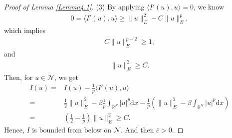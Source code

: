 \documentclass[12pt,a4paper,reqno]{amsart}
\numberwithin{equation}{section}
\begin{document}
\begin{proof}[Proof of Lemma \ref{Lemma4.1}]
(3)
By applying $\langle I'(u),u\rangle=0$, we know
\begin{equation*}
\begin{aligned}
0
=\langle I'(u),u\rangle\geqslant \|u\|_{E}^{2}
-C\|u\|_{E}^{p},
\end{aligned}
\end{equation*}
which implies
\begin{equation*}
\begin{aligned}
C\|u\|_{E}^{p-2}
\geqslant
1,
\end{aligned}
\end{equation*}
and
\begin{equation*}
\begin{aligned}
\|u\|_{E}^{2}
\geqslant C.
\end{aligned}
\end{equation*}
Then, for $u\in \mathcal{N}$, we get
\begin{equation*}\label{36}
\begin{aligned}
I(u)
=&
I(u)-\frac{1}{p}\langle I'(u),u\rangle\\
=&\frac{1}{2}\|u\|_{E}^{2}
-\beta\frac{1}{p}\int_{\mathbb{R}^{N}}|u|^{p}\mathrm{d}x
-\frac{1}{p}
\left(
\|u\|_{E}^{2}
-\beta\int_{\mathbb{R}^{N}}|u|^{p}\mathrm{d}x
\right)\\
=&
\left(\frac{1}{2}-\frac{1}{ p}\right)
\|u\|_{E}^{2}
\geqslant
C.
\end{aligned}
\end{equation*}
Hence, $I$ is bounded from below on $\mathcal{N}$. And then $\bar{c}>0$.






\end{proof}
\end{document}
